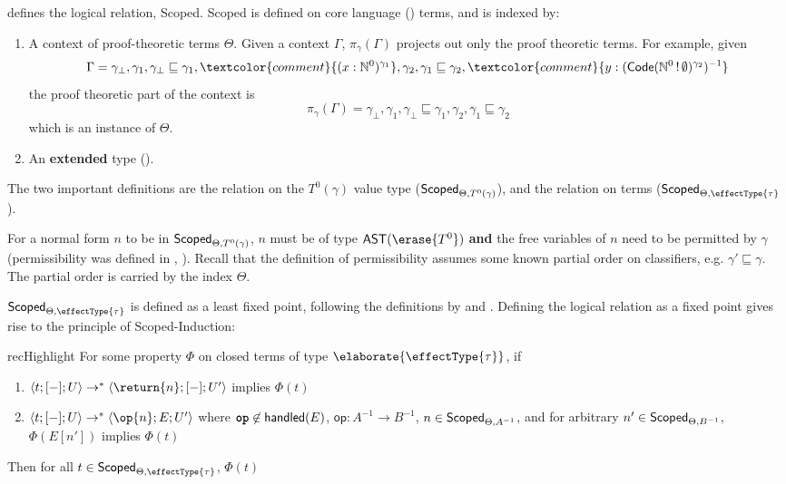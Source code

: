  defines the logical relation, \textsf{Scoped}. \textsf{Scoped} is defined on core language (\recCoreLang{}) terms, and is indexed by:
\begin{enumerate}
  \item A context of proof-theoretic terms $\Theta$. Given a context $\Gamma$, $\pi_{\gamma}({\Gamma})$ projects out only the proof theoretic terms. For example, given 
  \[\Gamma = \gamma_\bot, \gamma_1, \gamma_\bot \sqsubseteq \gamma_1, \textcolor{comment}{(x:\mathbb{N}^0)^{\gamma_1}}, \gamma_2, \gamma_1 \sqsubseteq \gamma_2,  \textcolor{comment}{y:(\textsf{Code}(\mathbb{N}^0 \, ! \, \emptyset)^{\gamma_2})^{-1}}\]
  the proof theoretic part of the context is
  \[\pi_{\gamma}({\Gamma}) = \gamma_\bot, \gamma_1, \gamma_\bot \sqsubseteq \gamma_1, \gamma_2, \gamma_1 \sqsubseteq \gamma_2 \]
  which is an instance of $\Theta$.
  \item An \textbf{extended} \recLang{} type (). 
\end{enumerate}

The two important definitions are the relation on the $T^{0} (\gamma)$ value type ($\textsf{Scoped}_{{\Theta}, {T^{0} (\gamma)}}$), and the relation on terms ($\scoped{\effectType{\tau}}$). 

For a normal form $n$ to be in $\textsf{Scoped}_{{\Theta}, {T^{0} (\gamma)}}$, $n$ must be of type $\textsf{AST}(\erase{T^0})$ \textbf{and} the free variables of $n$ need to be permitted by $\gamma$ (permissibility was defined in , ). Recall that the definition of permissibility assumes some known partial order on classifiers, e.g. $\gamma' \sqsubseteq \gamma$. The partial order is carried by the index $\Theta$. 

$\scoped{\effectType{\tau}}$ is defined as a least fixed point, following the definitions by \citet{plotkin-2025} and \citet{kuchta-2023}. Defining the logical relation as a fixed point gives rise to the principle of \textsf{Scoped}-Induction:

\begin{inductionPrinciple}{recHighlight}
  For some property $\Phi$ on closed terms of type $\elaborate{\effectType{\tau}}$, if
  \begin{enumerate}
    \item $\langle t; [-]; U \rangle \to^{*} \langle \return{n};[-];U' \rangle$ implies $\Phi(t)$
    \item $\langle t; [-]; U \rangle \to^{*} \langle \op{n};E;U' \rangle$ where $\textbf{\texttt{op}} \not\in \textsf{handled}(E)$, $\textsf{op}: A^{-1} \to B^{-1}$, $n \in \textsf{Scoped}_{{\Theta}, {A^{-1}}}$, and for arbitrary $n' \in \textsf{Scoped}_{{\Theta}, {B^{-1}}}$, $\Phi(E[n'])$ implies $\Phi(t)$
  \end{enumerate}
  Then for all $t \in \scoped{\effectType{\tau}}$, $\Phi(t)$
\end{inductionPrinciple}

